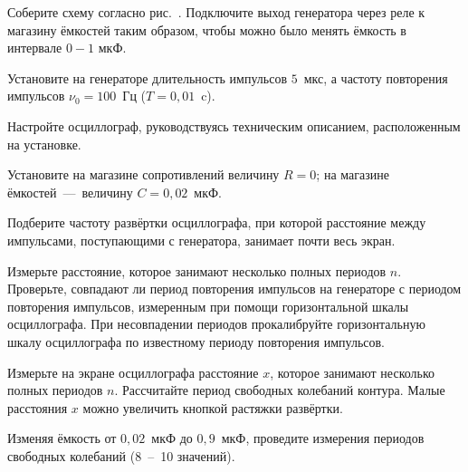 \begin{lab:task}




	\item Соберите схему согласно рис.~. Подключите
выход генератора через реле к магазину ёмкостей таким образом, чтобы можно было
менять ёмкость в интервале $0 - 1$ мкФ.

	\item Установите на генераторе длительность импульсов $5$~мкс, а частоту
повторения импульсов $\nu_0 = 100$~Гц ($T = 0,01$~c).

	\item Настройте осциллограф, руководствуясь техническим описанием,
расположенным на установке.


	\item Установите на магазине сопротивлений величину $R = 0$; на магазине
ёмкостей~---~величину $C = 0,02$~мкФ.

	\item Подберите частоту развёртки осциллографа, при которой расстояние между
импульсами, поступающими с генератора, занимает почти весь экран.

	\item Измерьте расстояние, которое занимают несколько полных периодов $n$.
Проверьте, совпадают ли период повторения импульсов на генераторе с периодом
повторения импульсов, измеренным при помощи горизонтальной шкалы осциллографа.
При несовпадении периодов прокалибруйте горизонтальную шкалу осциллографа по
известному периоду повторения импульсов.

	\item Измерьте на экране осциллографа расстояние $x$, которое занимают
несколько полных периодов $n$. Рассчитайте период свободных колебаний контура.
Малые расстояния $x$ можно увеличить кнопкой растяжки развёртки.

	\item Изменяя ёмкость от $0,02$~мкФ до $0,9$~мкФ, проведите измерения
периодов свободных колебаний (8~--~10 значений).




\end{lab:task}
